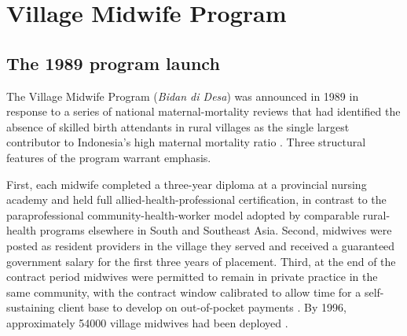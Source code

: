 
\section{Village Midwife Program} \label{sec:background}

\subsection{The 1989 program launch}

The Village Midwife Program (\emph{Bidan di Desa}) was announced in 1989 in response to a series of national maternal-mortality reviews that had identified the absence of skilled birth attendants in rural villages as the single largest contributor to Indonesia's high maternal mortality ratio \autocite{geefhuysen1999,gani1996}. Three structural features of the program warrant emphasis.

First, each midwife completed a three-year diploma at a provincial nursing academy and held full allied-health-professional certification, in contrast to the paraprofessional community-health-worker model adopted by comparable rural-health programs elsewhere in South and Southeast Asia. Second, midwives were posted as resident providers in the village they served and received a guaranteed government salary for the first three years of placement. Third, at the end of the contract period midwives were permitted to remain in private practice in the same community, with the contract window calibrated to allow time for a self-sustaining client base to develop on out-of-pocket payments \autocite{gani1996}. By 1996, approximately \num{54000} village midwives had been deployed \autocite{frankenberg2005}.

